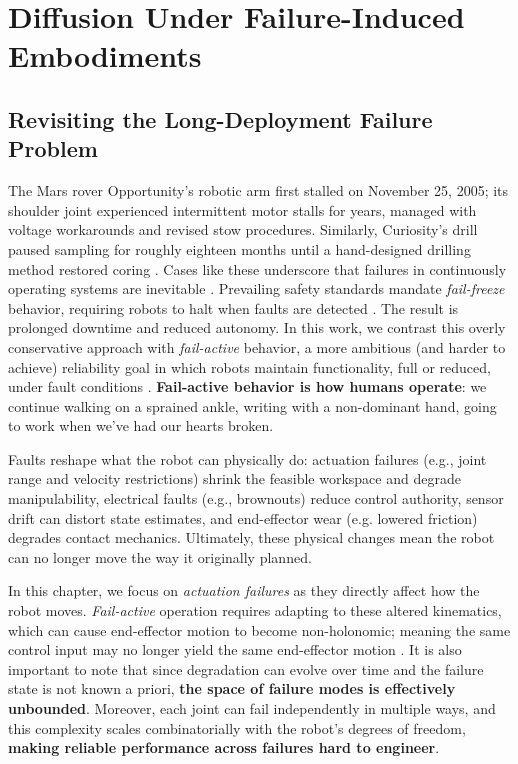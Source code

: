 
\chapter{Diffusion Under Failure-Induced Embodiments}
\label{ch:failures}

\section{Revisiting the Long-Deployment Failure Problem}
\label{sec:failures:revisit}

The Mars rover Opportunity's robotic arm first stalled on November 25, 2005; its shoulder joint experienced intermittent motor stalls for years, managed with voltage workarounds and revised stow procedures. Similarly, Curiosity's drill paused sampling for roughly eighteen months until a hand-designed drilling method restored coring \cite{nasa_science_first_drilled_sample_2018,jpl_opportunity_shoulder_2008}. Cases like these underscore that failures in continuously operating systems are inevitable \cite{factory_efficiency_2020}. Prevailing safety standards mandate \textsl{fail-freeze} behavior, requiring robots to halt when faults are detected \cite{ISO10218-1,ISO13849-1,IEC60204-1}. The result is prolonged downtime and reduced autonomy.
In this work, we contrast this overly conservative approach with \textsl{fail-active} behavior, a more ambitious (and harder to achieve) reliability goal in which robots maintain functionality, full or reduced, under fault conditions \cite{aero_reliability}. \textbf{Fail-active behavior is how humans operate}: we continue walking on a sprained ankle, writing with a non-dominant hand, going to work when we've had our hearts broken.

Faults reshape what the robot can physically do: actuation failures (e.g., joint range and velocity restrictions) shrink the feasible workspace and degrade manipulability, electrical faults (e.g., brownouts) reduce control authority, sensor drift can distort state estimates, and end-effector wear (e.g. lowered friction) degrades contact mechanics. Ultimately, these physical changes mean the robot can no longer move the way it originally planned.

In this chapter, we focus on \textit{actuation failures} as they directly affect how the robot moves. \textit{Fail-active} operation requires adapting to these altered kinematics, which can cause end-effector motion to become non-holonomic; meaning the same control input may no longer yield the same end-effector motion \cite{Bloch_Krishnaprasad_Murray_2016}.
It is also important to note that since degradation can evolve over time \cite{barbieri2015sensor} and the failure state is not known a priori, \textbf{the space of failure modes is effectively unbounded}. Moreover, each joint can fail independently in multiple ways, and this complexity scales combinatorially with the robot's degrees of freedom, \textbf{making reliable performance across failures hard to engineer}.

